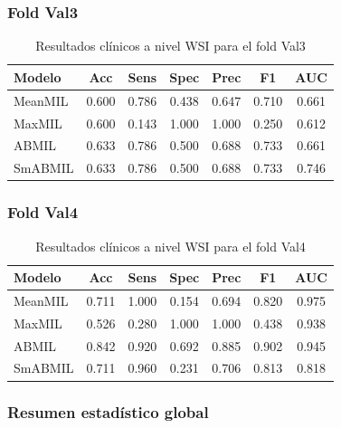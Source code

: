 \subsubsection*{Fold Val3}

\begin{table}[h!]
\centering
\caption{Resultados clínicos a nivel WSI para el fold Val3}
\begin{tabular}{|l|c|c|c|c|c|c|}
\hline
\textbf{Modelo} & \textbf{Acc} & \textbf{Sens} & \textbf{Spec} & \textbf{Prec} & \textbf{F1} & \textbf{AUC} \\
\hline
MeanMIL & 0.600 & 0.786 & 0.438 & 0.647 & 0.710 & 0.661 \\
MaxMIL  & 0.600 & 0.143 & 1.000 & 1.000 & 0.250 & 0.612 \\
ABMIL   & 0.633 & 0.786 & 0.500 & 0.688 & 0.733 & 0.661 \\
SmABMIL & 0.633 & 0.786 & 0.500 & 0.688 & 0.733 & 0.746 \\
\hline
\end{tabular}
\end{table}

\subsubsection*{Fold Val4}

\begin{table}[h!]
\centering
\caption{Resultados clínicos a nivel WSI para el fold Val4}
\begin{tabular}{|l|c|c|c|c|c|c|}
\hline
\textbf{Modelo} & \textbf{Acc} & \textbf{Sens} & \textbf{Spec} & \textbf{Prec} & \textbf{F1} & \textbf{AUC} \\
\hline
MeanMIL & 0.711 & 1.000 & 0.154 & 0.694 & 0.820 & 0.975 \\
MaxMIL  & 0.526 & 0.280 & 1.000 & 1.000 & 0.438 & 0.938 \\
ABMIL   & 0.842 & 0.920 & 0.692 & 0.885 & 0.902 & 0.945 \\
SmABMIL & 0.711 & 0.960 & 0.231 & 0.706 & 0.813 & 0.818 \\
\hline
\end{tabular}
\end{table}

\subsubsection*{Resumen estadístico global}

